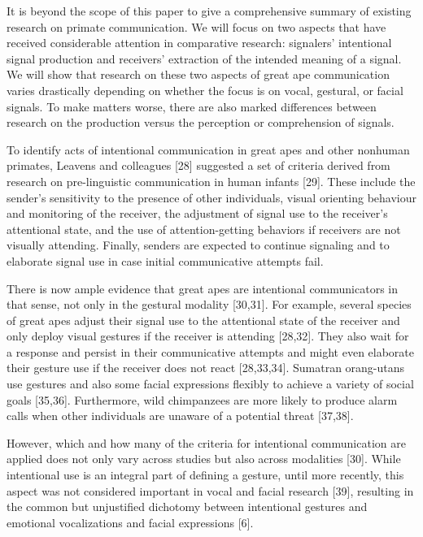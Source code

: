 \documentclass[
  man,floatsintext]{apa6}
\begin{document}
It is beyond the scope of this paper to give a comprehensive summary of existing research on primate communication. We will focus on two aspects that have received considerable attention in comparative research: signalers' intentional signal production and receivers' extraction of the intended meaning of a signal. We will show that research on these two aspects of great ape communication varies drastically depending on whether the focus is on vocal, gestural, or facial signals. To make matters worse, there are also marked differences between research on the production versus the perception or comprehension of signals.

To identify acts of intentional communication in great apes and other nonhuman primates, Leavens and colleagues {[}28{]} suggested a set of criteria derived from research on pre-linguistic communication in human infants {[}29{]}. These include the sender's sensitivity to the presence of other individuals, visual orienting behaviour and monitoring of the receiver, the adjustment of signal use to the receiver's attentional state, and the use of attention-getting behaviors if receivers are not visually attending. Finally, senders are expected to continue signaling and to elaborate signal use in case initial communicative attempts fail.

There is now ample evidence that great apes are intentional communicators in that sense, not only in the gestural modality {[}30,31{]}. For example, several species of great apes adjust their signal use to the attentional state of the receiver and only deploy visual gestures if the receiver is attending {[}28,32{]}. They also wait for a response and persist in their communicative attempts and might even elaborate their gesture use if the receiver does not react {[}28,33,34{]}. Sumatran orang-utans use gestures and also some facial expressions flexibly to achieve a variety of social goals {[}35,36{]}. Furthermore, wild chimpanzees are more likely to produce alarm calls when other individuals are unaware of a potential threat {[}37,38{]}.

However, which and how many of the criteria for intentional communication are applied does not only vary across studies but also across modalities {[}30{]}. While intentional use is an integral part of defining a gesture, until more recently, this aspect was not considered important in vocal and facial research {[}39{]}, resulting in the common but unjustified dichotomy between intentional gestures and emotional vocalizations and facial expressions {[}6{]}.
\end{document}
